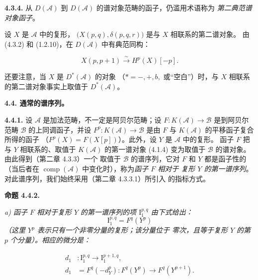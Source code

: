 \clearpage
{}%
\begingroup\small\setlength{\parskip}{0pt}\setlength{\emergencystretch}{1.5em}
\setlength{\abovedisplayskip}{4pt plus 2pt minus 2pt}%
\setlength{\belowdisplayskip}{4pt plus 2pt minus 2pt}%

\noindent\textbf{4.3.4.}\quad
从 $D(\mathcal A)$ 到 $D(\mathcal A)$ 的谱对象范畴的函子，仍滥用术语称为
\emph{第二典范谱对象函子}。

设 $X$ 是 $\mathcal A$ 中的复形，
$\bigl(X(p,q),\delta(p,q,r)\bigr)$ 是与 $X$ 相联系的第二谱对象。
由 (4.3.2) 和 (1.2.10)，在 $D(\mathcal A)$ 中有典范同构：

\begin{equation}
X(p,p+1)\xrightarrow{\sim}H^p(X)[-p].
\tag{4.3.4.1}
\end{equation}

还要注意，当 $X$ 是 $D^*(\mathcal A)$ 的对象
（$*=-,+,b,$ 或“空白”）时，与 $X$ 相联系的第二谱对象事实上取值于
$D^*(\mathcal A)$。

\medskip\noindent\textbf{4.4. 通常的谱序列。}

\noindent\textbf{4.4.1.}\quad
设 $\mathcal A$ 是加法范畴，不一定是阿贝尔范畴；设
$F\colon K(\mathcal A)\longrightarrow\mathcal B$ 是到阿贝尔范畴
$\mathcal B$ 的上同调函子，并设
$F^p\colon K(\mathcal A)\longrightarrow\mathcal B$ 是由 $F$ 与
$K(\mathcal A)$ 的平移函子复合所得的函子
（$F^p(X)=F(X[p])$）。此外，设 $Y$ 是 $\mathcal A$ 中的复形。
函子 $F$ 把与 $Y$ 相联系的、取值于 $K(\mathcal A)$ 的第一谱对象
(4.1.4) 变为取值于 $\mathcal B$ 的谱对象。由此得到（第二章 4.3.3）一个
取值于 $\mathcal B$ 的谱序列，它对 $F$ 和 $Y$ 都是函子性的（当后者在
$\operatorname{comp}(\mathcal A)$ 中变化时），称为\emph{函子 $F$ 相对于
复形 $Y$ 的第一谱序列}。对此谱序列，我们始终采用（第二章 4.3.3.1）所引入
的指标方式。

\medskip\noindent\textbf{命题 4.4.2.}\quad

\noindent\textit{a) 函子 $F$ 相对于复形 $Y$ 的第一谱序列的项
$\mathrm I_1^{p,q}$ 由下式给出：}
\[
\mathrm I_1^{p,q}=F^q(Y^p)
\]
\noindent\textit{（这里 $Y^p$ 表示只有一个非零分量的复形；该分量位于
零次，且等于复形 $Y$ 的第 $p$ 个分量）。相应的微分是：}

\[
\begin{aligned}
d_1&\colon\mathrm I_1^{p,q}\longrightarrow\mathrm I_1^{p+1,q},\\
d_1&=F^q(-d_Y^p)\colon F^q(Y^p)\longrightarrow F^q(Y^{p+1}).
\end{aligned}
\]

